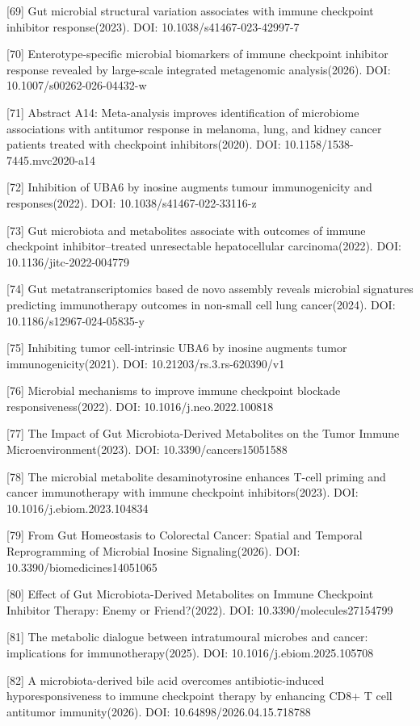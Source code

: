 \documentclass[11pt]{article}
\begin{document}
{[}69{]} Gut microbial structural variation associates with immune checkpoint inhibitor response(2023). DOI: 10.1038/s41467-023-42997-7

{[}70{]} Enterotype-specific microbial biomarkers of immune checkpoint inhibitor response revealed by large-scale integrated metagenomic analysis(2026). DOI: 10.1007/s00262-026-04432-w

{[}71{]} Abstract A14: Meta-analysis improves identification of microbiome associations with antitumor response in melanoma, lung, and kidney cancer patients treated with checkpoint inhibitors(2020). DOI: 10.1158/1538-7445.mvc2020-a14

{[}72{]} Inhibition of UBA6 by inosine augments tumour immunogenicity and responses(2022). DOI: 10.1038/s41467-022-33116-z

{[}73{]} Gut microbiota and metabolites associate with outcomes of immune checkpoint inhibitor--treated unresectable hepatocellular carcinoma(2022). DOI: 10.1136/jitc-2022-004779

{[}74{]} Gut metatranscriptomics based de novo assembly reveals microbial signatures predicting immunotherapy outcomes in non-small cell lung cancer(2024). DOI: 10.1186/s12967-024-05835-y

{[}75{]} Inhibiting tumor cell-intrinsic UBA6 by inosine augments tumor immunogenicity(2021). DOI: 10.21203/rs.3.rs-620390/v1

{[}76{]} Microbial mechanisms to improve immune checkpoint blockade responsiveness(2022). DOI: 10.1016/j.neo.2022.100818

{[}77{]} The Impact of Gut Microbiota-Derived Metabolites on the Tumor Immune Microenvironment(2023). DOI: 10.3390/cancers15051588

{[}78{]} The microbial metabolite desaminotyrosine enhances T-cell priming and cancer immunotherapy with immune checkpoint inhibitors(2023). DOI: 10.1016/j.ebiom.2023.104834

{[}79{]} From Gut Homeostasis to Colorectal Cancer: Spatial and Temporal Reprogramming of Microbial Inosine Signaling(2026). DOI: 10.3390/biomedicines14051065

{[}80{]} Effect of Gut Microbiota-Derived Metabolites on Immune Checkpoint Inhibitor Therapy: Enemy or Friend?(2022). DOI: 10.3390/molecules27154799

{[}81{]} The metabolic dialogue between intratumoural microbes and cancer: implications for immunotherapy(2025). DOI: 10.1016/j.ebiom.2025.105708

{[}82{]} A microbiota-derived bile acid overcomes antibiotic-induced hyporesponsiveness to immune checkpoint therapy by enhancing CD8+ T cell antitumor immunity(2026). DOI: 10.64898/2026.04.15.718788
\end{document}
